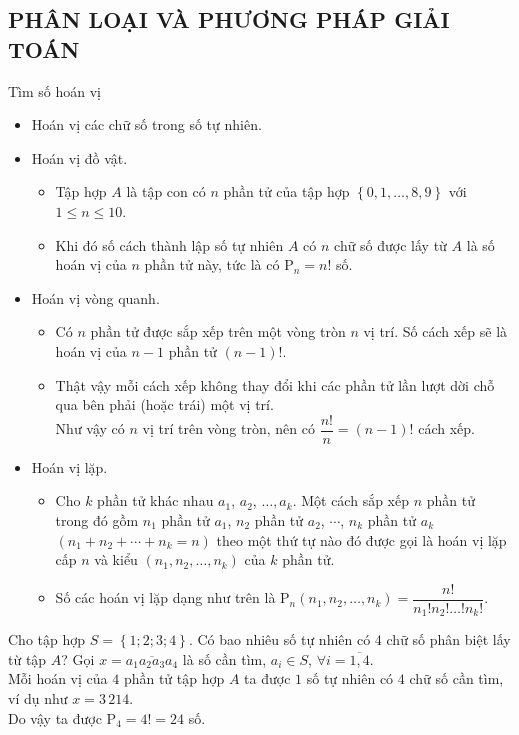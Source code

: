 \subsection{PHÂN LOẠI VÀ PHƯƠNG PHÁP GIẢI TOÁN}
\begin{dang}{Tìm số hoán vị}
\begin{itemize}
	\item[1.] Hoán vị các chữ số trong số tự nhiên.
	\item[2.] Hoán vị đồ vật.
	\begin{itemize}
		\item Tập hợp $A$ là tập con có $n$ phần tử của tập hợp $\left\{ 0,1,\ldots,8,9 \right\}$ với $1\le n\le 10$.
		\item Khi đó số cách thành lập số tự nhiên $A$ có $n$ chữ số được lấy từ $A$ là số hoán vị của $n$ phần tử này, tức là có $\mathrm{P}_n=n!$ số.
	\end{itemize}
	\item[3.] Hoán vị vòng quanh.
	\begin{itemize}
		\item Có $n$ phần tử được sắp xếp trên một vòng tròn $n$ vị trí. Số cách xếp sẽ là hoán vị của $n-1$ phần tử $(n-1)!$.
		\item Thật vậy mỗi cách xếp không thay đổi khi các phần tử lần lượt dời chỗ qua bên phải (hoặc trái) một vị trí.\\
		Như vậy có $n$ vị trí trên vòng tròn, nên có $\dfrac{n!}{n}=(n-1)!$ cách xếp.
	\end{itemize}
	\item[4.] Hoán vị lặp.
	\begin{itemize}
		\item Cho $k$ phần tử khác nhau $a_1$, $a_2$, $\ldots,a_k$. Một cách sắp xếp $n$ phần tử trong đó gồm $n_1$ phần tử $a_1$, $n_2$ phần tử $a_2$, $\cdots$, $n_k$ phần tử $a_k$ $(n_1+n_2+\cdots+n_k=n)$ theo một thứ tự nào đó được gọi là hoán vị lặp cấp $n$ và kiểu $(n_1,n_2,\ldots,n_k)$ của $k$ phần tử.
		\item Số các hoán vị lặp dạng như trên là $\mathrm{P}_n(n_1,n_2,\ldots,n_k)=\dfrac{n!}{n_1!n_2!\ldots!n_k!}$.
	\end{itemize}
\end{itemize}
\end{dang}
\begin{vd}
	Cho tập hợp $S=\left\{ 1;2;3;4 \right\}$. Có bao nhiêu số tự nhiên có $4$ chữ số phân biệt lấy từ tập $A$?
	\loigiai
	{
		Gọi $x=\overline{a_1a_2a_3a_4}$ là số cần tìm, $a_i\in S$, $\forall i=\overline{1,4}$.\\
		Mỗi hoán vị của $4$ phần tử tập hợp $A$ ta được $1$ số tự nhiên có $4$ chữ số cần tìm, ví dụ như $x=3\, 214$.\\
		Do vậy ta được $\mathrm{P}_4=4!=24$ số.
	}
\end{vd}
